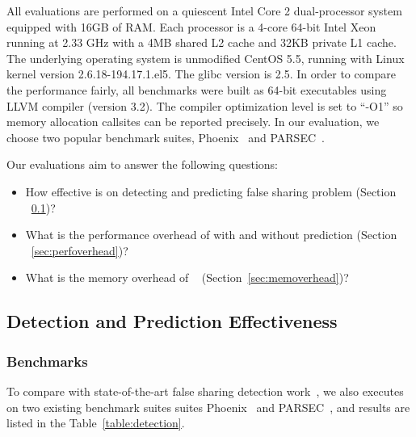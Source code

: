 \label{sec:evaluation}

All evaluations are performed on a quiescent Intel Core 2 dual-processor system equipped with 
16GB of RAM. 
Each processor is a 4-core 64-bit Intel Xeon running at 2.33 GHz with a 4MB
shared L2 cache and 32KB private L1 cache. 
The underlying operating system is unmodified CentOS 5.5, running with Linux kernel
version 2.6.18-194.17.1.el5. The glibc version is 2.5. 
In order to compare the performance fairly, all benchmarks were built as 64-bit executables 
using LLVM compiler (version 3.2). The compiler optimization level is set to ``-O1'' 
so memory allocation callsites can be reported precisely.
In our evaluation, we choose two popular benchmark suites, Phoenix~\cite{phoenix-hpca} and PARSEC~\cite{parsec}.

Our evaluations aim to answer the following questions:
\begin{itemize}
\item
  How effective is  on detecting and predicting false sharing problem (Section ~\ref{sec:effective})?

\item
  What is the performance overhead of  with and without prediction
  (Section ~\ref{sec:perfoverhead})?

\item
  What is the memory overhead of ~ (Section~\ref{sec:memoverhead})?
\end{itemize}


\subsection{Detection and Prediction Effectiveness}
\label{sec:effective}

\subsubsection{Benchmarks}
To compare with state-of-the-art false sharing detection work~\cite{sheriff, OSdetection}, 
we also executes  on two existing benchmark suites 
suites Phoenix~\cite{phoenix-hpca} and PARSEC~\cite{parsec}, 
and results are listed in the Table~\ref{table:detection}. 


